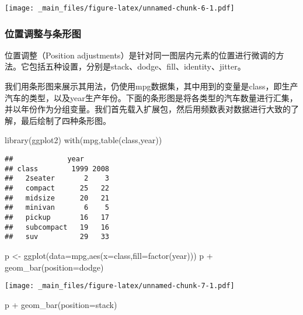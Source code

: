 \documentclass[
]{book}
\newenvironment{Shaded}{\begin{snugshade}}{\end{snugshade}}
\newcommand{\AttributeTok}[1]{\textcolor[rgb]{0.77,0.63,0.00}{#1}}
\newcommand{\FunctionTok}[1]{\textcolor[rgb]{0.00,0.00,0.00}{#1}}
\newcommand{\NormalTok}[1]{#1}
\newcommand{\OtherTok}[1]{\textcolor[rgb]{0.56,0.35,0.01}{#1}}
\newcommand{\SpecialCharTok}[1]{\textcolor[rgb]{0.00,0.00,0.00}{#1}}
\newcommand{\StringTok}[1]{\textcolor[rgb]{0.31,0.60,0.02}{#1}}
\begin{document}
\texttt{[image: \_main\_files/figure-latex/unnamed-chunk-6-1.pdf]}

\hypertarget{ux4f4dux7f6eux8c03ux6574ux4e0eux6761ux5f62ux56fe}{%
\subsubsection{位置调整与条形图}\label{ux4f4dux7f6eux8c03ux6574ux4e0eux6761ux5f62ux56fe}}

位置调整（Position adjustments）是针对同一图层内元素的位置进行微调的方法。它包括五种设置，分别是stack、dodge、fill、identity、jitter。

我们用条形图来展示其用法，仍使用mpg数据集，其中用到的变量是class，即生产汽车的类型，以及year生产年份。下面的条形图是将各类型的汽车数量进行汇集，并以年份作为分组变量。我们首先载入扩展包，然后用频数表对数据进行大致的了解，最后绘制了四种条形图。

\begin{Shaded}
\begin{Highlighting}[]
\FunctionTok{library}\NormalTok{(ggplot2)}
\FunctionTok{with}\NormalTok{(mpg,}\FunctionTok{table}\NormalTok{(class,year))}
\end{Highlighting}
\end{Shaded}

\begin{verbatim}
##             year
## class        1999 2008
##   2seater       2    3
##   compact      25   22
##   midsize      20   21
##   minivan       6    5
##   pickup       16   17
##   subcompact   19   16
##   suv          29   33
\end{verbatim}

\begin{Shaded}
\begin{Highlighting}[]
\NormalTok{p }\OtherTok{\textless{}{-}} \FunctionTok{ggplot}\NormalTok{(}\AttributeTok{data=}\NormalTok{mpg,}\FunctionTok{aes}\NormalTok{(}\AttributeTok{x=}\NormalTok{class,}\AttributeTok{fill=}\FunctionTok{factor}\NormalTok{(year)))}
\NormalTok{p }\SpecialCharTok{+} \FunctionTok{geom\_bar}\NormalTok{(}\AttributeTok{position=}\StringTok{\textquotesingle{}dodge\textquotesingle{}}\NormalTok{)}
\end{Highlighting}
\end{Shaded}

\texttt{[image: \_main\_files/figure-latex/unnamed-chunk-7-1.pdf]}

\begin{Shaded}
\begin{Highlighting}[]
\NormalTok{p }\SpecialCharTok{+} \FunctionTok{geom\_bar}\NormalTok{(}\AttributeTok{position=}\StringTok{\textquotesingle{}stack\textquotesingle{}}\NormalTok{)}
\end{Highlighting}
\end{Shaded}
\end{document}
